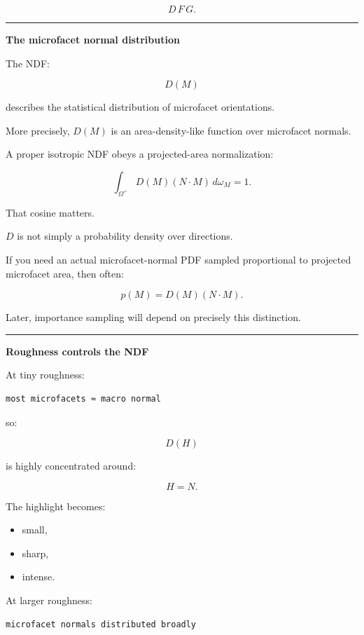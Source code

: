 \[
\boxed{
D\,F\,G.
}
\]

\begin{center}\rule{0.5\linewidth}{0.5pt}\end{center}

\textbf{The microfacet normal distribution}

The NDF:

\[
D(M)
\]

describes the statistical distribution of microfacet orientations.

More precisely, \(D(M)\) is an area-density-like function over microfacet normals.

A proper isotropic NDF obeys a projected-area normalization:

\[
\boxed{
\int_{\Omega^+}
D(M)(N\cdot M)
\,d\omega_M
=
1.
}
\]

That cosine matters.

\(D\) is not simply a probability density over directions.

If you need an actual microfacet-normal PDF sampled proportional to projected microfacet area, then often:

\[
p(M)=D(M)(N\cdot M).
\]

Later, importance sampling will depend on precisely this distinction.

\begin{center}\rule{0.5\linewidth}{0.5pt}\end{center}

\textbf{Roughness controls the NDF}

At tiny roughness:

\begin{verbatim}
most microfacets ≈ macro normal
\end{verbatim}

so:

\[
D(H)
\]

is highly concentrated around:

\[
H=N.
\]

The highlight becomes:

\begin{itemize}
\tightlist
\item
  small,
\item
  sharp,
\item
  intense.
\end{itemize}

At larger roughness:

\begin{verbatim}
microfacet normals distributed broadly
\end{verbatim}

